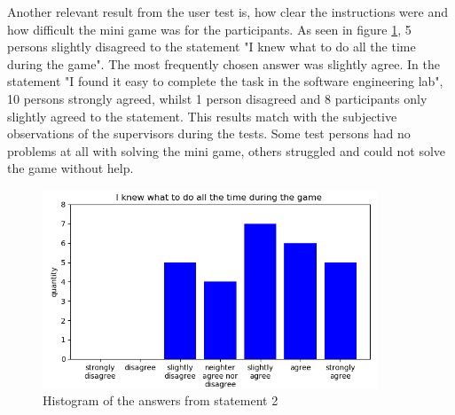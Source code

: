 Another relevant result from the user test is, how clear the instructions were and how difficult the mini game was for the participants. As seen in figure \ref{fig:chart-guidance-1}, 5 persons slightly disagreed to the statement "I knew what to do all the time during the game". The most frequently chosen answer was slightly agree. In the statement "I found it easy to complete the task in the software engineering lab", 10 persons strongly agreed, whilst 1 person disagreed and 8 participants only slightly agreed to the statement. This results match with the subjective observations of the supervisors during the tests. Some test persons had no problems at all with solving the mini game, others struggled and could not solve the game without help.
\begin{figure}[h!]
  \includegraphics[width=10cm]{kapitel/charts/guidance-1.png}
  \centering
  \caption{Histogram of the answers from statement 2}
  \label{fig:chart-guidance-1}
\end{figure}
